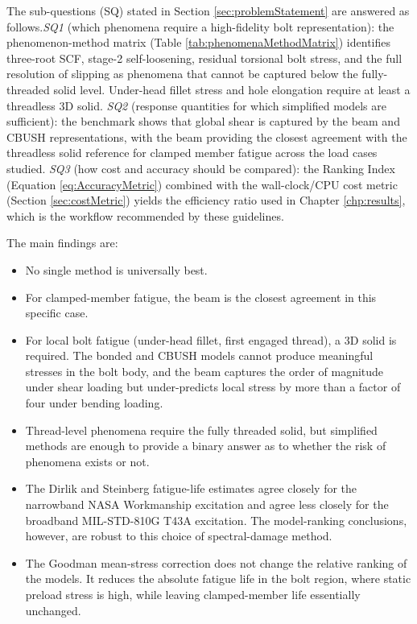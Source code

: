 \documentclass[a4paper,twoside]{bth}
\begin{document}
The sub-questions (SQ) stated in Section \ref{sec:problemStatement} are answered as follows.\textit{SQ1} (which phenomena require a high-fidelity bolt representation): the phenomenon-method matrix (Table \ref{tab:phenomenaMethodMatrix}) identifies three-root SCF, stage-2 self-loosening, residual torsional bolt stress, and the full resolution of slipping as phenomena that cannot be captured below the fully-threaded solid level. Under-head fillet stress and hole elongation require at least a threadless 3D solid. \textit{SQ2} (response quantities for which simplified models are sufficient): the benchmark shows that global shear is captured by the beam and CBUSH representations, with the beam providing the closest agreement with the threadless solid reference for clamped member fatigue across the load cases studied. \textit{SQ3} (how cost and accuracy should be compared): the Ranking Index (Equation \ref{eq:AccuracyMetric}) combined with the wall-clock/CPU cost metric (Section \ref{sec:costMetric}) yields the efficiency ratio used in Chapter \ref{chp:results}, which is the workflow recommended by these guidelines.


The main findings are:

\begin{itemize}
    \item No single method is universally best.
    \item For clamped-member fatigue, the beam is the closest agreement in this specific case.
    \item For local bolt fatigue (under-head fillet, first engaged thread), a 3D solid is required. The bonded and CBUSH models cannot produce meaningful stresses in the bolt body, and the beam captures the order of magnitude under shear loading but under-predicts local stress by more than a factor of four under bending loading.
    \item Thread-level phenomena require the fully threaded solid, but simplified methods are enough to provide a binary answer as to whether the risk of phenomena exists or not.
    \item The Dirlik and Steinberg fatigue-life estimates agree closely for the narrowband NASA Workmanship excitation and agree less closely for the broadband MIL-STD-810G T43A excitation. The model-ranking conclusions, however, are robust to this choice of spectral-damage method.
    \item The Goodman mean-stress correction does not change the relative ranking of the models. It reduces the absolute fatigue life in the bolt region, where static preload stress is high, while leaving clamped-member life essentially unchanged.
\end{itemize}
\end{document}
